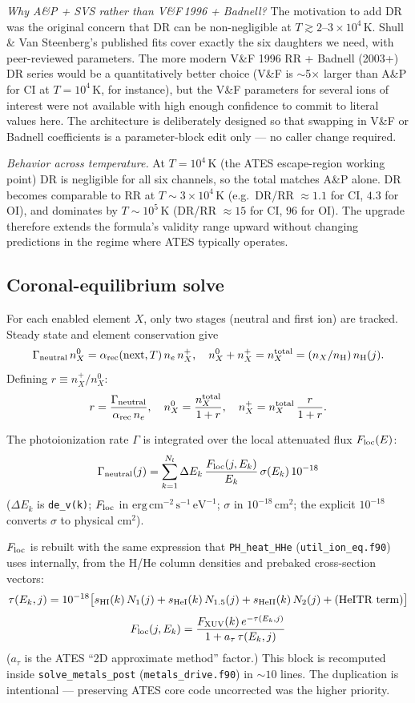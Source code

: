 \documentclass[english,a4paper]{kiseon_memo}
\begin{document}
\textit{Why A\&P + SVS rather than V\&F\,1996 + Badnell?} The motivation
to add DR was the original concern that DR can be non-negligible at
$T \gtrsim 2$--$3 \times 10^4\,$K. Shull \& Van Steenberg's published
fits cover exactly the six daughters we need, with peer-reviewed
parameters. The more modern V\&F 1996 RR + Badnell (2003+) DR series
would be a quantitatively better choice (V\&F is $\sim$5$\times$ larger
than A\&P for CI at $T = 10^4\,$K, for instance), but the V\&F
parameters for several ions of interest were not available with high
enough confidence to commit to literal values here. The architecture is
deliberately designed so that swapping in V\&F or Badnell coefficients
is a parameter-block edit only --- no caller change required.

\textit{Behavior across temperature.} At $T = 10^4\,$K (the ATES
escape-region working point) DR is negligible for all six channels,
so the total matches A\&P alone. DR becomes comparable to RR at
$T \sim 3\times 10^4\,$K (e.g.\ DR/RR $\approx 1.1$ for CI,
$4.3$ for OI), and dominates by $T \sim 10^5\,$K (DR/RR $\approx 15$ for
CI, $96$ for OI). The upgrade therefore extends the formula's
validity range upward without changing predictions in the regime where
ATES typically operates.

\subsection{Coronal-equilibrium solve}

For each enabled element $X$, only two stages (neutral and first ion) are
tracked. Steady state and element conservation give
\[
\Gamma_{\rm neutral}\,n_X^0
   = \alpha_{\rm rec}({\rm next}, T)\,n_e\,n_X^+,
\quad
n_X^0 + n_X^+ = n_X^{\rm total}
   = (n_X / n_{\rm H})\,n_{\rm H}(j).
\]
Defining $r \equiv n_X^+ / n_X^0$:
\[
r = \frac{\Gamma_{\rm neutral}}{\alpha_{\rm rec}\,n_e},
\quad
n_X^0 = \frac{n_X^{\rm total}}{1 + r},
\quad
n_X^+ = n_X^{\rm total}\,\frac{r}{1 + r}.
\]

The photoionization rate $\Gamma$ is integrated over the local attenuated
flux $F_{\rm loc}(E)$:
\[
\Gamma_{\rm neutral}(j)
= \sum_{k=1}^{N_l} \Delta E_k\,
   \frac{F_{\rm loc}(j, E_k)}{E_k}\,\sigma(E_k)\,10^{-18}
\]
($\Delta E_k$ is \texttt{de\_v(k)}; $F_{\rm loc}$ in
$\mathrm{erg\,cm^{-2}\,s^{-1}\,eV^{-1}}$; $\sigma$ in $10^{-18}\,\mathrm{cm}^2$;
the explicit $10^{-18}$ converts $\sigma$ to physical cm$^2$).

$F_{\rm loc}$ is rebuilt with the same expression that
\texttt{PH\_heat\_HHe} (\texttt{util\_ion\_eq.f90}) uses internally, from
the H/He column densities and prebaked cross-section vectors:
\[
\tau(E_k, j) = 10^{-18}
\big[ s_{\rm HI}(k)\,N_1(j)
    + s_{\rm HeI}(k)\,N_{1.5}(j)
    + s_{\rm HeII}(k)\,N_2(j)
    + (\text{HeITR term})\big]
\]
\[
F_{\rm loc}(j, E_k)
 = \frac{F_{\rm XUV}(k)\,e^{-\tau(E_k, j)}}
        {1 + a_\tau\,\tau(E_k, j)}
\]
($a_\tau$ is the ATES ``2D approximate method'' factor.) This block is
recomputed inside \texttt{solve\_metals\_post}
(\texttt{metals\_drive.f90}) in $\sim 10$ lines. The duplication is
intentional --- preserving ATES core code uncorrected was the higher
priority.
\end{document}
